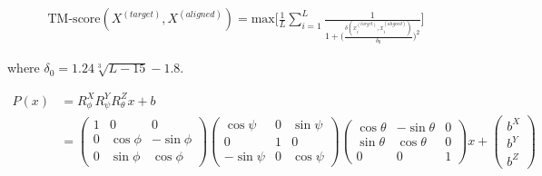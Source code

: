 \begin{align}
    \text{TM-score}(X^{(target)}, X^{(aligned)}) = \text{max} \Bigg[ \frac{1}{L} \sum\limits_{i=1}^L 
        \frac{1}{1 + \Big(\frac{\delta(x_i^{(target)}, x_i^{(aligned)})}{\delta_0}\Big)^2} \Bigg]
\end{align}

where $\delta_0 = 1.24 \sqrt[3]{L - 15} - 1.8$.


\begin{align*}
    P(x) & = R^X_{\phi} R^Y_{\psi} R^Z_{\theta} x + b \\
    & =
    \begin{pmatrix}
    1 & 0 & 0 \\
    0 & \cos{\phi} & -\sin{\phi} \\
    0 & \sin{\phi} & \cos{\phi}
    \end{pmatrix}
    \begin{pmatrix}
    \cos{\psi} & 0 & \sin{\psi} \\
    0 & 1 & 0 \\
    -\sin{\psi} & 0 & \cos{\psi}
    \end{pmatrix}
    \begin{pmatrix}
    \cos{\theta} & -\sin{\theta} & 0 \\
    \sin{\theta} & \cos{\theta} & 0 \\
    0 & 0 & 1
    \end{pmatrix}
    x +
    \begin{pmatrix}
    b^X \\
    b^Y \\
    b^Z
    \end{pmatrix}
\end{align*}
